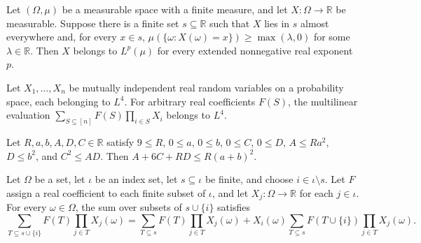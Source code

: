 \begin{theorem}
\leanok
{}
Let $(\Omega,\mu)$ be a measurable space with a finite measure, and let
$X:\Omega\to\mathbb R$ be measurable. Suppose there is a finite set $s\subseteq\mathbb
R$ such that $X$ lies in $s$ almost everywhere and, for every $x\in s$,
$\mu(\{\omega:X(\omega)=x\})\ge\max(\lambda,0)$ for some $\lambda\in\mathbb R$. Then $X$
belongs to $L^p(\mu)$ for every extended nonnegative real exponent $p$.
\end{theorem}

\begin{theorem}
\leanok
{}
Let $X_1,\ldots,X_n$ be mutually independent real random variables on a probability space, each belonging to $L^4$. For arbitrary real coefficients $F(S)$, the multilinear evaluation $\sum_{S\subseteq[n]}F(S)\prod_{i\in S}X_i$ belongs to $L^4$.
\end{theorem}

\begin{theorem}
\leanok
{}
Let $R,a,b,A,D,C\in\mathbb R$ satisfy $9\le R$, $0\le a$, $0\le b$, $0\le C$, $0\le D$,
$A\le Ra^2$, $D\le b^2$, and $C^2\le AD$. Then $A+6C+RD\le R(a+b)^2$.
\end{theorem}

\begin{theorem}
\leanok
{}
Let $\Omega$ be a set, let $\iota$ be an index set, let $s\subseteq\iota$ be finite, and
choose $i\in\iota\setminus s$. Let $F$ assign a real coefficient to each finite subset
of $\iota$, and let $X_j:\Omega\to\mathbb{R}$ for each $j\in\iota$. For every
$\omega\in\Omega$, the sum over subsets of $s\cup\{i\}$ satisfies
\[\sum_{T\subseteq s\cup\{i\}}F(T)\prod_{j\in T}X_j(\omega)=\sum_{T\subseteq s}F(T)\prod_{j\in T}X_j(\omega)+X_i(\omega)\sum_{T\subseteq s}F(T\cup\{i\})\prod_{j\in T}X_j(\omega).\]
\end{theorem}

